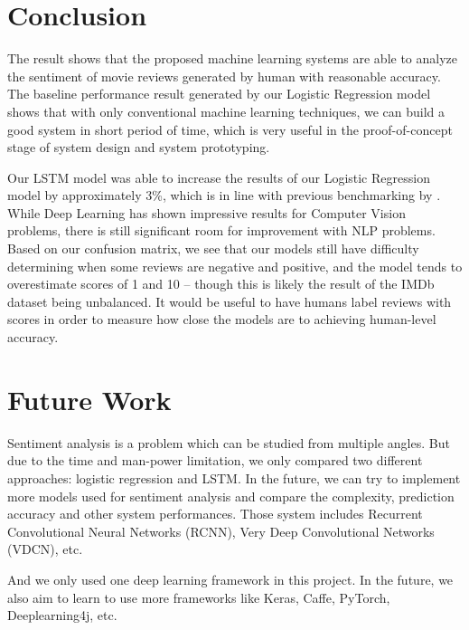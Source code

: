 \documentclass[conference]{IEEEtran}
\begin{document}
\section{Conclusion}
\label{conclusion}
    The result shows that the proposed machine learning systems are able to 
    analyze the sentiment of movie reviews generated by human with reasonable
    accuracy. The baseline performance result generated by our Logistic Regression
    model shows that with only conventional machine learning techniques, we can 
    build a good system in short period of time, which is very useful in the
    proof-of-concept stage of system design and system prototyping.
    
    Our LSTM model was able to increase the results of our Logistic Regression model
    by approximately 3\%, which is in line with previous benchmarking by \cite{W17-5202}.
    While Deep Learning has shown impressive results for Computer Vision problems,
    there is still significant room for improvement with NLP problems. Based on our confusion
    matrix, we see that our models still have difficulty determining when some reviews are
    negative and positive, and the model tends to overestimate scores of 1 and 10 -- though
    this is likely the result of the IMDb dataset being unbalanced. It would be useful to 
    have humans label reviews with scores in order to measure how close the models 
    are to achieving human-level accuracy.
        
\section{Future Work}
\label{future}
    Sentiment analysis is a problem which can be studied from multiple angles. But due 
    to the time and man-power limitation, we only compared two different approaches:
    logistic regression and LSTM. In the future, we can try to implement more models used
    for sentiment analysis and compare the complexity, prediction accuracy and other
    system performances. Those system includes Recurrent Convolutional
    Neural Networks (RCNN)\cite{lai2015recurrent}, Very Deep Convolutional Networks 
    (VDCN)\cite{conneau2017very}, etc.
    
    And we only used one deep learning framework in this project. In the future, we
    also aim to learn to use more frameworks like Keras\cite{chollet2015keras},
    Caffe\cite{jia2014caffe}, PyTorch\cite{paszke2017automatic}, 
    Deeplearning4j\cite{nicholson2017deeplearning4j}, etc.
    
\end{document}
